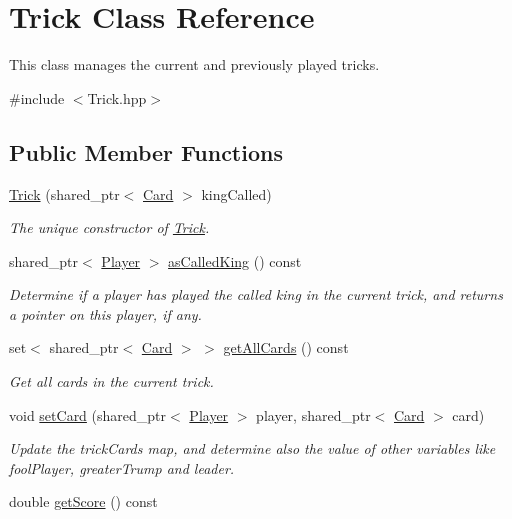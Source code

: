 \hypertarget{classTrick}{\section{Trick Class Reference}
\label{classTrick}
}


This class manages the current and previously played tricks.  




{\ttfamily \#include $<$Trick.\-hpp$>$}

\subsection*{Public Member Functions}
\begin{DoxyCompactItemize}
\item 
\hyperlink{classTrick_a2d52be4c67d65793531d2dc96122ae72}{Trick} (shared\-\_\-ptr$<$ \hyperlink{classCard}{Card} $>$ king\-Called)
\begin{DoxyCompactList}\small\item\em The unique constructor of \hyperlink{classTrick}{Trick}. \end{DoxyCompactList}\item 
\hypertarget{classTrick_a4d196a8097feccd87f1aca65ea4e80c8}{shared\-\_\-ptr$<$ \hyperlink{classPlayer}{Player} $>$ \hyperlink{classTrick_a4d196a8097feccd87f1aca65ea4e80c8}{as\-Called\-King} () const }\label{classTrick_a4d196a8097feccd87f1aca65ea4e80c8}

\begin{DoxyCompactList}\small\item\em Determine if a player has played the called king in the current trick, and returns a pointer on this player, if any. \end{DoxyCompactList}\item 
\hypertarget{classTrick_a1db9b6c13def25e38b6604b56d97ddd2}{set$<$ shared\-\_\-ptr$<$ \hyperlink{classCard}{Card} $>$ $>$ \hyperlink{classTrick_a1db9b6c13def25e38b6604b56d97ddd2}{get\-All\-Cards} () const }\label{classTrick_a1db9b6c13def25e38b6604b56d97ddd2}

\begin{DoxyCompactList}\small\item\em Get all cards in the current trick. \end{DoxyCompactList}\item 
void \hyperlink{classTrick_a4d2b4c09c8d7c255ff34bde5fe29532a}{set\-Card} (shared\-\_\-ptr$<$ \hyperlink{classPlayer}{Player} $>$ player, shared\-\_\-ptr$<$ \hyperlink{classCard}{Card} $>$ card)
\begin{DoxyCompactList}\small\item\em Update the trick\-Cards map, and determine also the value of other variables like fool\-Player, greater\-Trump and leader. \end{DoxyCompactList}\item 
\hypertarget{classTrick_a63625303ef93e30fec915b8cd039e6af}{double \hyperlink{classTrick_a63625303ef93e30fec915b8cd039e6af}{get\-Score} () const }\label{classTrick_a63625303ef93e30fec915b8cd039e6af}


\end{DoxyCompactItemize}
